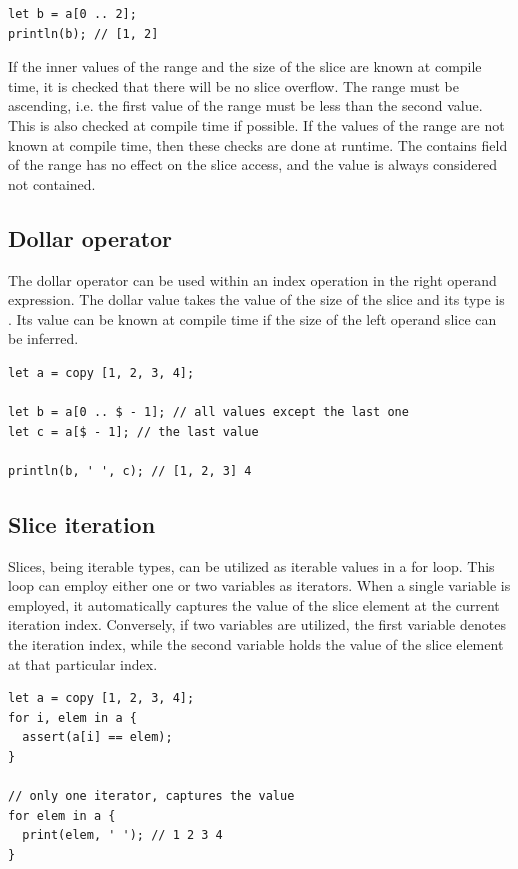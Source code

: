 \begin{itemize}
\begin{lstlisting}[style=coloredverbatim]
let b = a[0 .. 2];
println(b); // [1, 2]
  \end{lstlisting}

  If the inner values of the range and the size of the slice are known at
  compile time, it is checked that there will be no slice overflow. The range
  must be ascending, i.e. the first value of the range must be less than the
  second value. This is also checked at compile time if possible. If the values
  of the range are not known at compile time, then these checks are done at
  runtime. The contains field of the range has no effect on the slice access, and
  the  value is always considered not contained.

\end{itemize}


\subsection{Dollar operator}

The dollar operator can be used within an index operation in the right operand
expression. The dollar value takes the value of the size of the slice and its
type is . Its value can be known at compile time if the size of
the left operand slice can be inferred.

\begin{lstlisting}[style=coloredverbatim]
let a = copy [1, 2, 3, 4];

let b = a[0 .. $ - 1]; // all values except the last one
let c = a[$ - 1]; // the last value

println(b, ' ', c); // [1, 2, 3] 4
\end{lstlisting}


\subsection{Slice iteration}

Slices, being iterable types, can be utilized as iterable values in a for loop.
This loop can employ either one or two variables as iterators. When a single
variable is employed, it automatically captures the value of the slice element
at the current iteration index. Conversely, if two variables are utilized, the
first variable denotes the iteration index, while the second variable holds the
value of the slice element at that particular index.

\begin{lstlisting}[style=coloredverbatim]
let a = copy [1, 2, 3, 4];
for i, elem in a {
  assert(a[i] == elem);
}

// only one iterator, captures the value
for elem in a {
  print(elem, ' '); // 1 2 3 4
}
\end{lstlisting}

